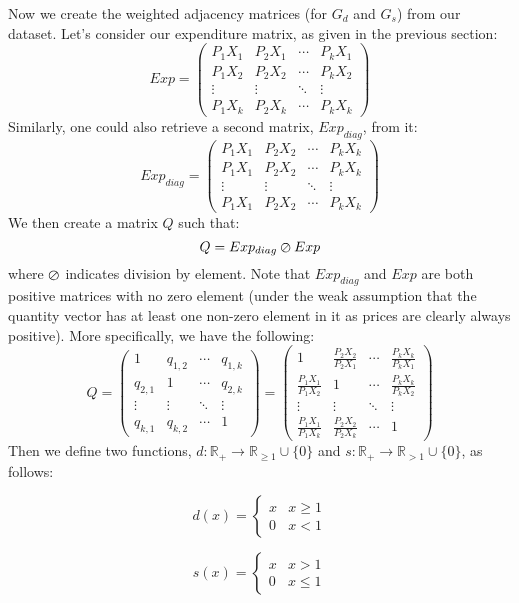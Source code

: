 \documentclass{article} %
\theoremstyle{style1}
\theoremstyle{example}
\begin{document}
Now we create the weighted adjacency matrices (for $G_d$ and $G_s$) from our dataset. Let's consider our expenditure matrix, as given in the previous section:
\[
Exp = 
 \begin{pmatrix}
  P_1X_1 & P_2X_1 & \cdots & P_kX_1 \\
  P_1X_2 & P_2X_2 & \cdots & P_kX_2 \\
  \vdots  & \vdots  & \ddots & \vdots  \\
  P_1X_k & P_2X_k & \cdots & P_kX_k
 \end{pmatrix}
\]
Similarly, one could also retrieve a second matrix, $Exp_{diag}$, from it:
\[
Exp_{diag} = 
 \begin{pmatrix}
  P_1X_1 & P_2X_2 & \cdots & P_kX_k \\
  P_1X_1 & P_2X_2 & \cdots & P_kX_k \\
  \vdots  & \vdots  & \ddots & \vdots  \\
  P_1X_1 & P_2X_2 & \cdots & P_kX_k
 \end{pmatrix}
\]
We then create a matrix $Q$ such that:
\[
Q = Exp_{diag} \varoslash Exp
\]
where $\varoslash$ indicates division by element. Note that $Exp_{diag}$ and $Exp$ are both positive matrices with no zero element (under the weak assumption that the quantity vector has at least one non-zero element in it as prices are clearly always positive). More specifically, we have the following:
\[
Q = 
 \begin{pmatrix}
  1 & q_{1,2} & \cdots & q_{1,k} \\
  q_{2,1} & 1 & \cdots & q_{2,k} \\
  \vdots & \vdots & \ddots & \vdots \\
  q_{k,1} & q_{k,2} & \cdots & 1
 \end{pmatrix} =
 \begin{pmatrix}
 1 & \frac{P_2X_2}{P_2X_1} & \cdots & \frac{P_kX_k}{P_kX_1} \\[6pt]
 \frac{P_1X_1}{P_1X_2} & 1 & \cdots & \frac{P_kX_k}{P_kX_2} \\[6pt]
 \vdots & \vdots & \ddots & \vdots \\[6pt]
 \frac{P_1X_1}{P_1X_k} & \frac{P_2X_2}{P_2X_k} & \cdots & 1
 \end{pmatrix}
\]
Then we define two functions, $d:\mathbb{R}_{+}\to\mathbb{R}_{\geq1}\cup\{0\}$ and $s:\mathbb{R}_{+}\to\mathbb{R}_{>1}\cup\{0\}$, as follows:

\begin{minipage}{.5\linewidth}
\[ 
d(x)=
 \begin{cases} 
   x & x\geq1 \\
    0 & x<1
 \end{cases}
\]
\end{minipage}
\begin{minipage}{.5\linewidth}
\[
s(x)=
    \begin{cases} 
      x & x>1 \\
      0 & x\leq1
   \end{cases}
\]
\end{minipage}
\end{document}
